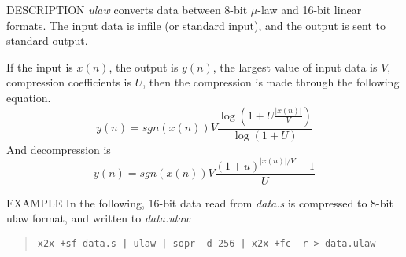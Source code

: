 \begin{synopsis}
\item[ulaw] [ --v $V$ ] [ --u $U$ ] [ --c ] [ --d ] [ {\em infile} ]
\end{synopsis}

\begin{qsection}{DESCRIPTION}
{\em ulaw} converts data between 8-bit $\mu$-law and 16-bit linear formats.
The input data is {\rm infile} (or standard input), 
and the output is sent to standard output.

If the input is $x(n)$, the output is $y(n)$,
the largest value of input data is $V$, compression coefficients is $U$,
then the compression is made through the following equation.
\begin{displaymath}
y(n) = sgn(x(n)) V \frac{\log(1 + U \frac{|x(n)|}{V} )}{\log(1+U)}
\end{displaymath}
And decompression is
\begin{displaymath}
y(n) = sgn(x(n)) V \frac{(1+u)^{|x(n)|/V} - 1}{U}
\end{displaymath}
\end{qsection}

\begin{options}
\end{options}

\begin{qsection}{EXAMPLE}
In the following, 16-bit data read from {\em data.s}
is compressed to 8-bit ulaw format, and written to {\em data.ulaw}
\begin{quote}
  \verb!x2x +sf data.s | ulaw | sopr -d 256 | x2x +fc -r > data.ulaw!
\end{quote}
\end{qsection}

